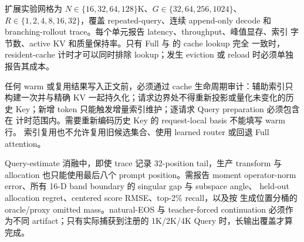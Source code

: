 扩展实验网格为 $N\in\{16,32,64,128\}$K、$G\in\{32,64,256,1024\}$、
$R\in\{1,2,4,8,16,32\}$，覆盖 repeated-query、连续 append-only decode 和
branching-rollout trace。每个单元报告 latency、throughput、峰值显存、索引
字节数、active KV 和质量保持率。只有 Full 与 \method 的 cache lookup 完全
一致时，resident-cache 计时才可以同时排除 lookup；发生 eviction 或 reload
时必须单独报告其成本。

任何 warm 或复用结果写入正文前，必须通过 cache 生命周期审计：辅助索引只
构建一次并与精确 KV 一起持久化；请求边界处不得重新投影或量化未变化的历史
Key；新增 token 只能触发增量索引维护；逐请求 Query preparation 必须包含在
计时范围内。需要重新编码历史 Key 的 request-local basis 不能填写 warm 行。
索引复用也不允许复用旧候选集合、使用 learned router 或回退 Full attention。

\begin{table}[h]
\caption{必须补齐的方法与系统对比。}
\centering
{}
\end{table}

Query-estimate 消融中，即使 trace 记录 32-position tail，生产 transform 与
allocation 也只能使用最后八个 prompt position。需报告 moment operator-norm
error、所有 16-D band boundary 的 singular gap 与 subspace angle、
held-out allocation regret、centered score RMSE、top-2\% recall，以及按
生成位置分桶的 oracle/proxy omitted mass。natural-EOS 与 teacher-forced
continuation 必须作为不同 artifact；只有实际捕获到注册的 1K/2K/4K Query
时，长输出覆盖才算完成。

